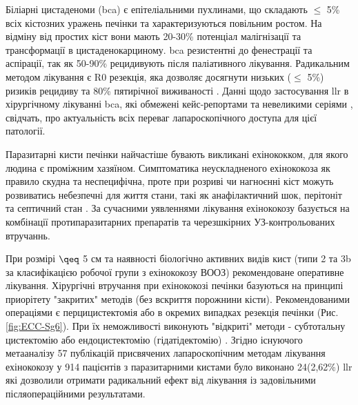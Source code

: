Біліарні цистаденоми (\acrshort{bca}) є епітеліальними пухлинами, що складають $\leq$ 5\% всіх кістозних уражень печінки та характеризуються повільним ростом. На відміну від простих кіст вони  мають 20-30\% потенціал малігнізації та трансформації в цистаденокарциному. \acrshort{bca} резистентні до фенестрації та аспірації, так як 50-90\% рецидивують після паліативного лікування. Радикальним методом лікування є R0 резекція, яка дозволяє досягнути низьких ($\leq$ 5\%) ризиків рецидиву та 80\% пятирічної виживаності \cite{Soares2015}. Данні щодо застосування \acrshort{llr} в хірургічному лікуванні \acrshort{bca}, які обмежені кейс-репортами \cite{Machado2014, Li2016a} та невеликими серіями \cite{Koffron2004}, свідчать, про актуальність всіх переваг лапароскопічного доступа для цієї патології.

Паразитарні кисти печінки найчастіше бувають викликані ехінококком, для якого людина є проміжним хазяїном. Симптоматика неускладненого ехінококоза як правило скудна та неспецифічна, проте при розриві чи нагноєнні кіст можуть розвиватись небезпечні для життя стани, такі як анафілактичний шок, перітоніт та септичний стан \cite{Finazzi2015}. За сучасними уявленнями лікування ехінококозу базується на комбінації протипаразитарних препаратів та черезшкірних УЗ-контрольованих втручаннь. 

При розмірі $\qeq$ 5 см та наявності біологічно активних видів кист (типи 2 та 3b за класифікацією робочої групи з ехінококозу ВООЗ) рекомендоване оперативне лікування. Хірургічні втручання при ехінококозі печінки базуються на принципі приорітету "закритих" методів (без вскриття порожнини кісти). Рекомендованими операціями є перцицистектомія або в окремих випадках резекція печінки (Рис. \ref{fig:ECC-Sg6}). При їх неможливості виконують "відкриті" методи - субтотальну цистектомію або ендоцистектомію (гідатідектомію) \cite{Wen2019}. Згідно існуючого метааналізу 57 публікацій присвячених лапароскопічним методам лікування ехінококозу у 914 пацієнтів з паразитарними кистами було виконано 24(2,62\%) \acrshort{llr} які дозволили отримати радикальний ефект від лікування із задовільними післяопераційними результатами.  

 


